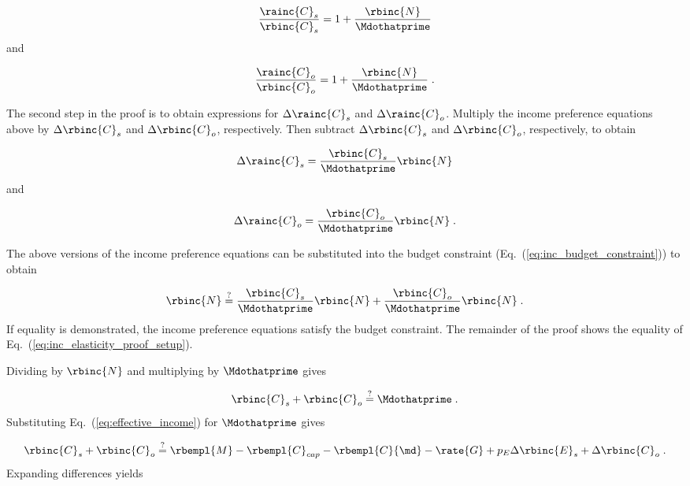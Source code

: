 \begin{equation}
    \frac{\rainc{C}_s}{\rbinc{C}_s} = 1 + \frac{\rbinc{N}}{\Mdothatprime}
\end{equation}
%
and

\begin{equation}
  \frac{\rainc{C}_o}{\rbinc{C}_o} = 1 + \frac{\rbinc{N}}{\Mdothatprime} \; .
\end{equation}
%

The second step in the proof is to obtain expressions 
for $\Delta \rainc{C}_s$ and $\Delta \rainc{C}_o$.
Multiply the income preference equations above
by $\Delta \rbinc{C}_s$ and $\Delta \rbinc{C}_o$, respectively.
Then subtract $\Delta \rbinc{C}_s$ and $\Delta \rbinc{C}_o$, respectively, 
to obtain

\begin{equation}
  \Delta \rainc{C}_s = \frac{\rbinc{C}_s}{\Mdothatprime} \rbinc{N}
\end{equation}
%
and

\begin{equation}
  \Delta \rainc{C}_o = \frac{\rbinc{C}_o}{\Mdothatprime} \rbinc{N} \; .
\end{equation}

The above versions of the income preference equations 
can be substituted into the budget constraint
(Eq.~(\ref{eq:inc_budget_constraint})) to obtain

\begin{equation} \label{eq:inc_elasticity_proof_setup}
  \rbinc{N} \stackrel{?}{=} \frac{\rbinc{C}_s}{\Mdothatprime} \rbinc{N} 
                            + \frac{\rbinc{C}_o}{\Mdothatprime}  \rbinc{N} \; .
\end{equation}
%
If equality is demonstrated, 
the income preference equations satisfy the budget constraint.
The remainder of the proof shows the equality
of Eq.~(\ref{eq:inc_elasticity_proof_setup}).

Dividing by $\rbinc{N}$ and multiplying by $\Mdothatprime$ gives

\begin{equation}
  \rbinc{C}_s + \rbinc{C}_o \stackrel{?}{=} \Mdothatprime \; .
\end{equation}
%
Substituting Eq.~(\ref{eq:effective_income}) for $\Mdothatprime$ gives

\begin{equation}
  \rbinc{C}_s + \rbinc{C}_o \stackrel{?}{=} \rbempl{M} - \rbempl{C}_{cap} - \rbempl{C}{\md} 
                       - \rate{G} + p_E \Delta \rbinc{E}_s + \Delta \rbinc{C}_o \; .
\end{equation}
%
Expanding differences yields

